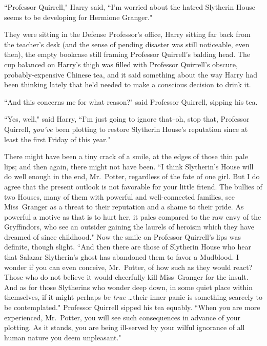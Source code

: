 \later

``Professor Quirrell," Harry said, ``I'm worried about the hatred Slytherin House seems to be developing for Hermione Granger."

They were sitting in the Defense Professor's office, Harry sitting far back from the teacher's desk (and the sense of pending disaster was still noticeable, even then), the empty bookcase still framing Professor Quirrell's balding head. The cup balanced on Harry's thigh was filled with Professor Quirrell's obscure, probably-expensive Chinese tea, and it said something about the way Harry had been thinking lately that he'd needed to make a conscious decision to drink it.

``And this concerns me for what reason?" said Professor Quirrell, sipping his tea.

``Yes, well," said Harry, ``I'm just going to ignore that\---oh, stop that, Professor Quirrell, \emph{you've} been plotting to restore Slytherin House's reputation since at least the first Friday of this year."

There might have been a tiny crack of a smile, at the edges of those thin pale lips; and then again, there might not have been. ``I think Slytherin's House will do well enough in the end, Mr.~Potter, regardless of the fate of one girl. But I do agree that the present outlook is not favorable for your little friend. The bullies of two Houses, many of them with powerful and well-connected families, see Miss~Granger as a threat to their reputation and a shame to their pride. As powerful a motive as that is to hurt her, it pales compared to the raw envy of the Gryffindors, who see an outsider gaining the laurels of heroism which they have dreamed of since childhood." Now the smile on Professor Quirrell's lips was definite, though slight. ``And then there are those of Slytherin House who hear that Salazar Slytherin's ghost has abandoned them to favor a Mudblood. I wonder if you can even conceive, Mr.~Potter, of how such as they would react? Those who do not believe it would cheerfully kill Miss~Granger for the insult. And as for those Slytherins who wonder deep down, in some quiet place within themselves, if it might perhaps be \emph{true} {\ldots}their inner panic is something scarcely to be contemplated." Professor Quirrell sipped his tea equably. ``When you are more experienced, Mr.~Potter, you will see such consequences in advance of your plotting. As it stands, you are being ill-served by your wilful ignorance of all human nature you deem unpleasant."

